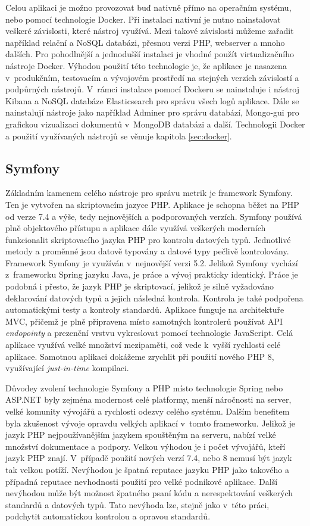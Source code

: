 \documentclass[czech,master]{diploma}
\begin{document}
Celou aplikaci je možno provozovat buď nativně přímo na operačním systému, nebo pomocí technologie Docker. Při instalaci nativní je nutno nainstalovat veškeré závislosti, které nástroj využívá. Mezi takové závislosti můžeme zařadit například relační a NoSQL databázi, přesnou verzi PHP, webserver a mnoho dalších. Pro pohodlnější a jednodušší instalaci je vhodné použít virtualizačního nástroje Docker. Výhodou použití této technologie je, že aplikace je nasazena v~produkčním, testovacím a vývojovém prostředí na stejných verzích závislostí a podpůrných nástrojů. V~rámci instalace pomocí Dockeru se nainstaluje i nástroj Kibana a NoSQL databáze Elasticsearch pro správu všech logů aplikace. Dále se nainstalují nástroje jako například Adminer pro správu databází,  Mongo-gui pro grafickou vizualizaci dokumentů v~MongoDB databázi a další. Technologii Docker a použití využívaných nástrojů se věnuje kapitola \ref{sec:docker}.

\subsection{Symfony}
\label{sec:symfony}
Základním kamenem celého nástroje pro správu metrik je framework Symfony. Ten je vytvořen na skriptovacím jazyce PHP. Aplikace je schopna běžet na PHP od verze 7.4 a výše, tedy nejnovějších a podporovaných verzích. Symfony používá plně objektového přístupu a aplikace dále využívá veškerých moderních funkcionalit skriptovacího jazyka PHP pro kontrolu datových typů. Jednotlivé metody a proměnné jsou datově typovány a datové typy pečlivě kontrolovány. Framework Symfony je využíván v~nejnovější verzi 5.2. Jelikož Symfony vychází z~frameworku Spring jazyku Java, je práce a vývoj prakticky identický. Práce je podobná i přesto, že jazyk PHP je skriptovací, jelikož je silně vyžadováno deklarování datových typů a jejich následná kontrola. Kontrola je také podpořena automatickými testy a kontroly standardů. Aplikace funguje na architektuře MVC, přičemž je plně připravena místo samotných kontrolerů používat API \textit{endopointy} a prezenční vrstvu vykreslovat pomocí technologie JavaScript. Celá aplikace využívá velké množství mezipaměti, což vede k~vyšší rychlosti celé aplikace. Samotnou aplikaci dokážeme zrychlit při použití nového PHP 8, využívající \textit{just-in-time} kompilaci.

Důvodey zvolení technologie Symfony a PHP místo technologie Spring nebo ASP.NET byly zejména modernost celé platformy, menší náročnosti na server, velké komunity vývojářů a rychlosti odezvy celého systému. Dalším benefitem byla zkušenost vývoje opravdu velkých aplikací v~tomto frameworku. Jelikož je jazyk PHP nejpoužívanějším jazykem spouštěným na serveru, nabízí velké množství dokumentace a podpory. \cite{ref:php_trend} Velkou výhodou je i počet vývojářů, kteří jazyk PHP znají.  V~případě použití nových verzí 7.4, nebo 8 nemusí být jazyk tak velkou potíží. Nevýhodou je špatná reputace jazyku PHP jako takového a případná reputace nevhodnosti použití pro velké podnikové aplikace. Další nevýhodou může být možnost špatného psaní kódu a nerespektování veškerých standardů a datových typů. Tato nevýhoda lze, stejně jako v~této práci, podchytit automatickou kontrolou a opravou standardů.
\end{document}
